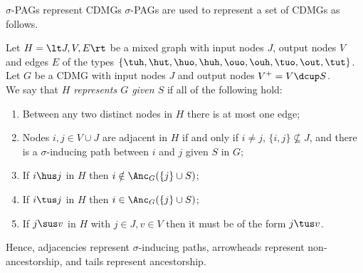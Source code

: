 \begin{frame}{$\sigma$-PAGs represent CDMGs}
$\sigma$-PAGs are used to represent a set of CDMGs as follows.
\begin{Def}[\ref{def:sigmapag_represents_cdmg}]
  Let $H = \lt J,V,E\rt$ be a mixed graph with input nodes $J$, output nodes $V$ and edges $E$ of the types $\{\tuh,\hut,\huo,\huh,\ouo,\ouh,\tuo,\out,\tut\}$.\\
  Let $G$ be a CDMG with input nodes $J$ and output nodes $V^+ = V \dcup S$.\\
  We say that \emph{$H$ represents $G$ given $S$} if all of the following hold:
  \begin{enumerate}
    \item Between any two distinct nodes in $H$ there is at most one edge;
    \item Nodes $i,j \in V \cup J$ are adjacent in $H$ if and only if $i \ne j$, $\{i,j\} \not\subseteq J$, and there is a $\sigma$-inducing path between $i$ and $j$ given $S$ in $G$;
    \item If $i \hus j$ in $H$ then $i \notin \Anc_{G}(\{j\} \cup S)$;
    \item If $i \tus j$ in $H$ then $i \in \Anc_{G}(\{j\} \cup S)$;
    \item If $j \sus v$ in $H$ with $j \in J, v \in V$ then it must be of the form $j \tus v$. 
  \end{enumerate}
\end{Def}
Hence, adjacencies represent $\sigma$-inducing paths, arrowheads represent non-ancestorship, and tails represent ancestorship.
\end{frame}

